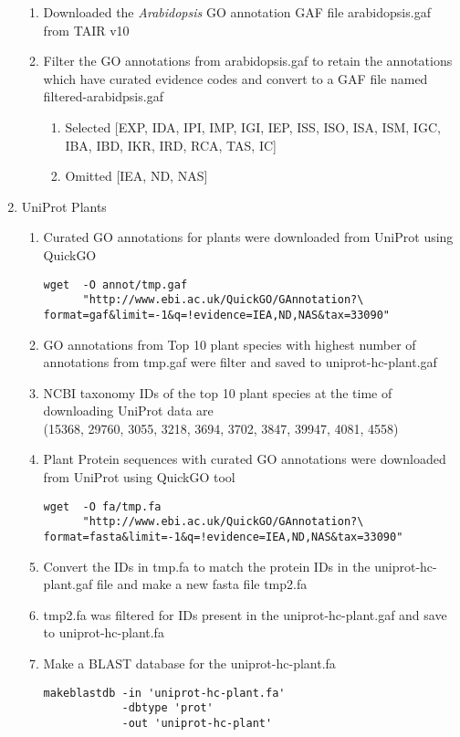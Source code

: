 \begin{enumerate}
\begin{enumerate}
      \item Downloaded the \emph{Arabidopsis} GO annotation GAF file arabidopsis.gaf  from TAIR v10
      \item Filter the GO annotations from arabidopsis.gaf to retain the annotations which have curated evidence codes and convert to a GAF file named filtered-arabidpsis.gaf \\
            \begin{enumerate}
              \item Selected [EXP, IDA, IPI, IMP, IGI, IEP, ISS, ISO, ISA, ISM, IGC, IBA, IBD, IKR, IRD, RCA, TAS, IC]
              \item Omitted [IEA, ND, NAS]
            \end{enumerate}
    \end{enumerate}
    \item UniProt Plants
    \begin{enumerate}
      \item Curated GO annotations for plants were downloaded from UniProt using QuickGO
      \begin{verbatim}
wget  -O annot/tmp.gaf
      "http://www.ebi.ac.uk/QuickGO/GAnnotation?\ format=gaf&limit=-1&q=!evidence=IEA,ND,NAS&tax=33090"
      \end{verbatim}
      \item GO annotations from Top 10 plant species with highest number of annotations from tmp.gaf were filter and saved to uniprot-hc-plant.gaf
      \item NCBI taxonomy IDs of the top 10 plant species at the time of downloading UniProt data are \\
      (15368, 29760, 3055, 3218, 3694, 3702, 3847, 39947, 4081, 4558)
      \item Plant Protein sequences with curated GO annotations were downloaded from UniProt using QuickGO tool
      \begin{verbatim}
wget  -O fa/tmp.fa
      "http://www.ebi.ac.uk/QuickGO/GAnnotation?\ format=fasta&limit=-1&q=!evidence=IEA,ND,NAS&tax=33090"
      \end{verbatim}
      \item Convert the IDs in tmp.fa to match the protein IDs in the uniprot-hc-plant.gaf file and make a new fasta file tmp2.fa
      \item tmp2.fa was filtered for IDs present in the uniprot-hc-plant.gaf and save to uniprot-hc-plant.fa
      \item Make a BLAST database for the uniprot-hc-plant.fa
      \begin{verbatim}
makeblastdb -in 'uniprot-hc-plant.fa'
            -dbtype 'prot'
            -out 'uniprot-hc-plant'
      \end{verbatim}
  \end{enumerate}
  \end{enumerate}


